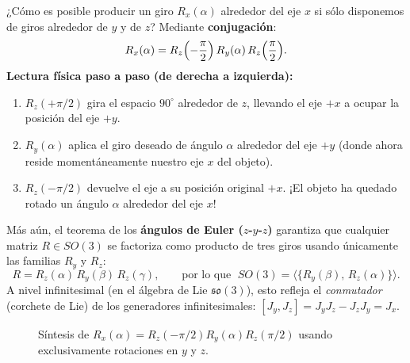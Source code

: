\documentclass[11pt,letterpaper]{article}
\newcommand{\term}[1]{\textbf{\color{orangeacc}#1}}
\begin{document}
¿Cómo es posible producir un giro $R_x(\alpha)$ alrededor del eje $x$ si sólo disponemos de giros alrededor de $y$ y de $z$? Mediante \term{conjugación}:
\begin{equation}
  R_x(\alpha) = R_z\Bigl(-\frac{\pi}{2}\Bigr)\, R_y(\alpha)\, R_z\Bigl(\frac{\pi}{2}\Bigr).
\end{equation}
\textbf{Lectura física paso a paso (de derecha a izquierda):}
\begin{enumerate}
  \item $R_z(+\pi/2)$ gira el espacio $90^\circ$ alrededor de $z$, llevando el eje $+x$ a ocupar la posición del eje $+y$.
  \item $R_y(\alpha)$ aplica el giro deseado de ángulo $\alpha$ alrededor del eje $+y$ (donde ahora reside momentáneamente nuestro eje $x$ del objeto).
  \item $R_z(-\pi/2)$ devuelve el eje a su posición original $+x$. ¡El objeto ha quedado rotado un ángulo $\alpha$ alrededor del eje $x$!
\end{enumerate}
Más aún, el teorema de los \term{ángulos de Euler ($z$-$y$-$z$)} garantiza que cualquier matriz $R\in SO(3)$ se factoriza como producto de tres giros usando únicamente las familias $R_y$ y $R_z$:
\begin{equation}
  R = R_z(\alpha)\,R_y(\beta)\,R_z(\gamma), \qquad\text{por lo que }\; SO(3) = \bigl\langle \{R_y(\beta),\,R_z(\alpha)\} \bigr\rangle.
\end{equation}
A nivel infinitesimal (en el álgebra de Lie $\mathfrak{so}(3)$), esto refleja el \emph{conmutador} (corchete de Lie) de los generadores infinitesimales: $[J_y, J_z] = J_y J_z - J_z J_y = J_x$.

\begin{figure}[htbp]
\centering
{}
\caption{Síntesis de $R_x(\alpha) = R_z(-\pi/2)R_y(\alpha)R_z(\pi/2)$ usando exclusivamente rotaciones en $y$ y $z$.}
\label{fig:conjugacion}
\end{figure}
\FloatBarrier
\end{document}
